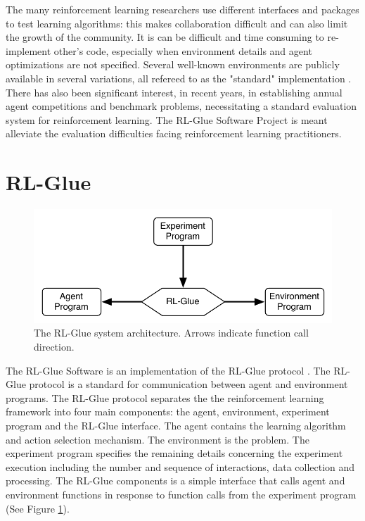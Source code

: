 \documentclass[twopage,11pt]{article}
\begin{document}
 


The many reinforcement learning researchers use different interfaces and packages to test learning algorithms: this makes collaboration difficult and can also limit the growth of the community. It is can be difficult and time consuming to re-implement other's code, especially when environment details and agent optimizations are not specified. Several well-known environments are publicly available in several variations, all refereed to as the "standard" implementation \cite{whiteThesis}. There has also been significant interest, in recent years, in establishing annual agent competitions and benchmark problems, necessitating a standard evaluation system for reinforcement learning. The RL-Glue Software Project is meant alleviate the evaluation difficulties facing reinforcement learning practitioners.


















 



	 

\section{RL-Glue}

\begin{figure}[h]
\begin{center}
\includegraphics[width = 9 cm]{glue.pdf}
\vspace{-0.2cm}
\caption{\small The RL-Glue system architecture. Arrows indicate function call direction.}\label{fig:RLDIA}
\end{center}
\vspace{-0.4cm}
\end{figure}

The RL-Glue Software is an implementation of the RL-Glue protocol \cite{whitesutton}. The RL-Glue protocol is a standard for communication between agent and environment programs. The RL-Glue protocol separates the the reinforcement learning framework into four main components: the agent, environment, experiment program and the RL-Glue interface. The agent contains the learning algorithm and action selection mechanism. The environment is the problem. The experiment program specifies the remaining details concerning the experiment execution including the number and sequence of interactions, data collection and processing.  The RL-Glue components is a simple interface that calls agent and environment functions in response to function calls from the experiment program (See Figure \ref{fig:RLDIA}). 
\end{document}
